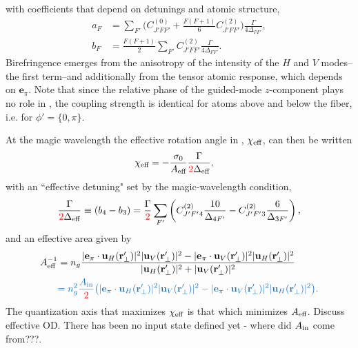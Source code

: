 \documentclass[preprint,aps,pra,onecolumn]{revtex4-1} %
\newcommand{\inp}{{\rm in}}
\newcommand{\change}[1]{{\color{RoyalBlue} #1}}
\newcommand{\comment}[1]{{\color{Maroon} #1}}
\newcommand{\error}[1]{{\color{red} #1}}
\begin{document}
with coefficients that depend on detunings and atomic structure,
	\begin{align}
		a_F &= \sum_{F'}  \Big(C^{(0)}_{J'FF'} + \frac{F(F+1)}{6} C^{(2)}_{J'FF'} \Big) \frac{\Gamma}{4 \Delta_{FF'}},\\
		b_F &= \frac{F(F+1)}{2}\sum_{F'} C^{(2)}_{J'FF'}  \frac{\Gamma}{4 \Delta_{FF'}}.
	\end{align}
Birefringence emerges from the anisotropy of the intensity of the $H$ and $V$ modes--the first term--and additionally from the tensor atomic response, which depends on $\mathbf{e}_\pi$.  Note that since the relative phase of the guided-mode $z$-component plays no role in , the coupling strength is identical for atoms above and below the fiber, i.e. for $\phi' = \{0,\pi\}$.

At the magic wavelength the effective rotation angle in , $\chi_{\text{eff}}$, can then be written
	\begin{align}
		\chi_{\eff} %
			& = - \frac{\sigma_0}{A_{\eff}} \frac{\Gamma}{\error{2}\Delta_{\eff}},
	\end{align}
with an ``effective detuning" set by the magic-wavelength condition,
	\begin{align} 
		\frac{\Gamma}{\error{2} \Delta_{\eff}} \equiv (b_4 - b_3) =  \frac{\Gamma}{\error{2}} \sum_{F'}  \left( C^{(2)}_{J'F'4}\frac{10}{\Delta_{4F'}} -  C^{(2)}_{J'F'3}\frac{6}{ \Delta_{3F'} } \right),
	\end{align}
and an effective area given by
	\begin{align}
		A_{\eff}^{-1} & = n_g \frac{ |\mathbf{e}_\pi \cdot \mathbf{u}_H(\br'_\perp) |^2 |\mathbf{u}_V(\br'_\perp)|^2 - |\mathbf{e}_\pi \cdot \mathbf{u}_V(\br'_\perp)|^2 |\mathbf{u}_H(\br'_\perp)|^2}{ |\mathbf{u}_H(\br'_\perp)|^2 + |\mathbf{u}_V(\br'_\perp)|^2 } \\
		& \change{ = n^2_g \frac{A_\inp}{\error{2}} \big( |\mathbf{e}_\pi \cdot \mathbf{u}_H(\br'_\perp) |^2 |\mathbf{u}_V(\br'_\perp)|^2 - |\mathbf{e}_\pi \cdot \mathbf{u}_V(\br'_\perp)|^2 |\mathbf{u}_H(\br'_\perp)|^2 \big). }
	\end{align}	
The quantization axis that maximizes $\chi_{\text{eff}}$ is that which minimizes $A_{\text{eff}}$.  \comment{Discuss effective OD. There has been no input state defined yet - where did $A_\inp$ come from???}.
\end{document}
